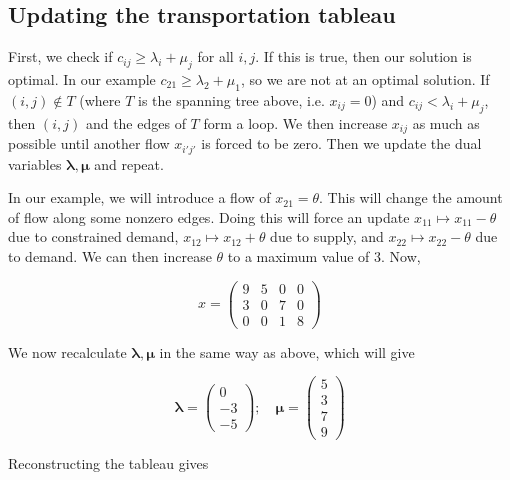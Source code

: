 \subsection{Updating the transportation tableau}
First, we check if \( c_{ij} \geq \lambda_i + \mu_j \) for all \( i, j \).
If this is true, then our solution is optimal.
In our example \( c_{21} \geq \lambda_2 + \mu_1 \), so we are not at an optimal solution.
If \( (i,j) \notin T \) (where \( T \) is the spanning tree above, i.e.
\( x_{ij} = 0 \)) and \( c_{ij} < \lambda_i + \mu_j \), then \((i,j)\) and the edges of \( T \) form a loop.
We then increase \( x_{ij} \) as much as possible until another flow \(x_{i'j'}\) is forced to be zero.
Then we update the dual variables \( \bm \lambda, \bm \mu \) and repeat.

In our example, we will introduce a flow of \( x_{21} = \theta \).
This will change the amount of flow along some nonzero edges.
Doing this will force an update \( x_{11} \mapsto x_{11} - \theta \) due to constrained demand, \( x_{12} \mapsto x_{12} + \theta \) due to supply, and \( x_{22} \mapsto x_{22} - \theta \) due to demand.
We can then increase \( \theta \) to a maximum value of \( 3 \).
Now,

\[
	x = \begin{pmatrix}
		9 & 5 & 0 & 0 \\
		3 & 0 & 7 & 0 \\
		0 & 0 & 1 & 8
	\end{pmatrix}
\]

\noindent We now recalculate \( \bm\lambda,\bm\mu \) in the same way as above, which will give

\[
	\bm\lambda = \begin{pmatrix}
		0 \\-3\\-5
	\end{pmatrix};\quad \bm\mu = \begin{pmatrix}
		5 \\3\\7\\9
	\end{pmatrix}
\]

\noindent Reconstructing the tableau gives

